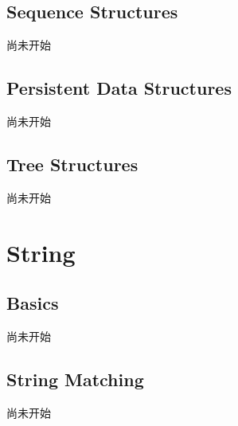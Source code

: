 \documentclass[10pt]{ctexart}
\begin{document}
{\subsection{Sequence Structures}
尚未开始
\subsection{Persistent Data Structures}
尚未开始
\subsection{Tree Structures}
尚未开始


\newpage
\section{String}
\subsection{Basics}
尚未开始
\subsection{String Matching}
尚未开始
}
\end{document}
